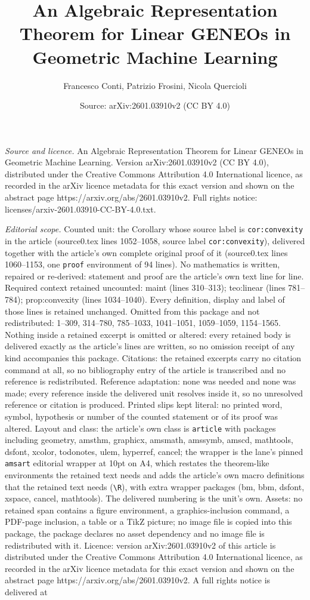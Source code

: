 \documentclass[10pt,a4paper]{amsart}
\title[An Algebraic Representation Theorem for Linear GENEOs in Geo]{An Algebraic Representation Theorem for Linear GENEOs in Geometric Machine Learning}
\author{Francesco Conti, Patrizio Frosini, Nicola Quercioli}
\date{Source: arXiv:2601.03910v2 (CC BY 4.0)}
\begin{document}
\maketitle

\noindent\emph{Source and licence.} An Algebraic Representation Theorem for Linear GENEOs in Geometric Machine Learning. Version arXiv:2601.03910v2 (CC BY 4.0), distributed under the Creative Commons Attribution 4.0 International licence, as recorded in the arXiv licence metadata for this exact version and shown on the abstract page https://arxiv.org/abs/2601.03910v2. Full rights notice: licenses/arxiv-2601.03910-CC-BY-4.0.txt.\par\smallskip

\noindent\textit{Editorial scope.} Counted unit: the Corollary whose source label is \texttt{cor:convexity} in the article (source0.tex lines 1052--1058, source label \texttt{cor:convexity}), delivered together with the article's own complete original proof of it (source0.tex lines 1060--1153, one \texttt{proof} environment of 94 lines). No mathematics is written, repaired or re-derived: statement and proof are the article's own text line for line. Required context retained uncounted: maint (lines 310--313); teo:linear (lines 781--784); prop:convexity (lines 1034--1040). Every definition, display and label of those lines is retained unchanged. Omitted from this package and not redistributed: 1--309, 314--780, 785--1033, 1041--1051, 1059--1059, 1154--1565. Nothing inside a retained excerpt is omitted or altered: every retained body is delivered exactly as the article's lines are written, so no omission receipt of any kind accompanies this package. Citations: the retained excerpts carry no citation command at all, so no bibliography entry of the article is transcribed and no reference is redistributed. Reference adaptation: none was needed and none was made; every reference inside the delivered unit resolves inside it, so no unresolved reference or citation is produced. Printed slips kept literal: no printed word, symbol, hypothesis or number of the counted statement or of its proof was altered. Layout and class: the article's own class is \texttt{article} with packages including geometry, amsthm, graphicx, amsmath, amssymb, amscd, mathtools, dsfont, xcolor, todonotes, ulem, hyperref, cancel; the wrapper is the lane's pinned \texttt{amsart} editorial wrapper at 10pt on A4, which restates the theorem-like environments the retained text needs and adds the article's own macro definitions that the retained text needs (\texttt{\textbackslash R}), with extra wrapper packages (bm, bbm, dsfont, xspace, cancel, mathtools). The delivered numbering is the unit's own. Assets: no retained span contains a figure environment, a graphics-inclusion command, a PDF-page inclusion, a table or a TikZ picture; no image file is copied into this package, the package declares no asset dependency and no image file is redistributed with it. Licence: version arXiv:2601.03910v2 of this article is distributed under the Creative Commons Attribution 4.0 International licence, as recorded in the arXiv licence metadata for this exact version and shown on the abstract page https://arxiv.org/abs/2601.03910v2. A full rights notice is delivered at 
\end{document}
